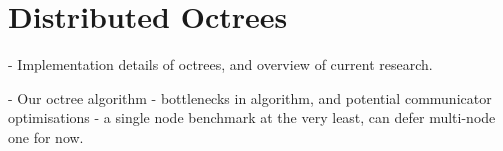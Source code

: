 \section{Distributed Octrees}

- Implementation details of octrees, and overview of current research.

- Our octree algorithm
    - bottlenecks in algorithm, and potential communicator optimisations
    - a single node benchmark at the very least, can defer multi-node one for now.

